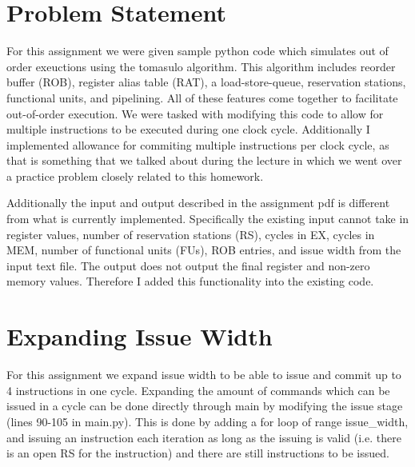 \documentclass[12pt, twocolumn]{article}
\begin{document}
\hspace*{2cm}
\section{Problem Statement}
For this assignment we were given sample python code which simulates out of order exeuctions using the tomasulo algorithm. This algorithm includes reorder buffer (ROB), register alias table (RAT), a load-store-queue, reservation stations, functional units, and pipelining. All of these features come together to facilitate out-of-order execution. We were tasked with modifying this code to allow for multiple instructions to be executed during one clock cycle. Additionally I implemented allowance for commiting multiple instructions per clock cycle, as that is something that we talked about during the lecture in which we went over a practice problem closely related to this homework.

Additionally the input and output described in the assignment pdf is different from what is currently implemented. Specifically the existing input cannot take in register values, number of reservation stations (RS), cycles in EX, cycles in MEM, number of functional units (FUs), ROB entries, and issue width from the input text file. The output does not output the final register and non-zero memory values. Therefore I added this functionality into the existing code.

\section{Expanding Issue Width}
For this assignment we expand issue width to be able to issue and commit up to 4 instructions in one cycle. Expanding the amount of commands which can be issued in a cycle can be done directly through main by modifying the issue stage (lines 90-105 in main.py). This is done by adding a for loop of range issue\_width, and issuing an instruction each iteration as long as the issuing is valid (i.e. there is an open RS for the instruction) and there are still instructions to be issued.
\end{document}
